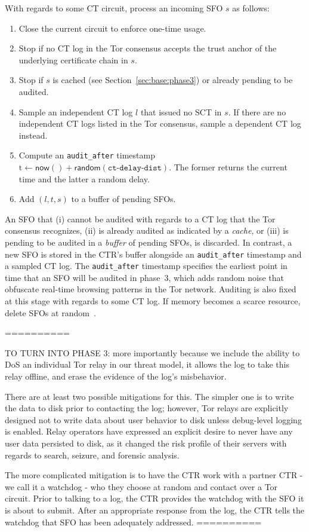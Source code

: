With regards to some CT circuit, process an incoming SFO $s$ as follows:
\begin{enumerate}
    \item\label{enm:storage:close} Close the current circuit to enforce one-time
        usage.
    \item\label{enm:storage:unrecognized} Stop if no CT log in the Tor consensus
        accepts the trust anchor of the underlying certificate chain in $s$.
    \item\label{enm:storage:cached}
        Stop if $s$ is cached (see Section~\ref{sec:base:phase3}) or already pending to be audited.
    \item\label{enm:storage:fix-log} Sample an independent CT log $l$ that
        issued no SCT in $s$.  If there are no independent CT logs listed in the
        Tor consensus, sample a dependent CT log instead.
    \item\label{enm:storage:audit-after} Compute an \texttt{audit\_after}
        timestamp $\textrm{t} \gets \mathsf{now()} +
            \mathsf{random}(\texttt{ct-delay-dist})$.
        The former returns the current time and the latter a random delay.
    \item\label{enm:storage:store} Add $(l,t,s)$ to a buffer of pending SFOs.
\end{enumerate}

An SFO that
    (i) cannot be audited with regards to a CT log that the Tor consensus
        recognizes,
    (ii) is already audited as indicated by a \emph{cache}, or
    (iii) is pending to be audited in a \emph{buffer} of pending SFOs,
is discarded.  In contrast, a new SFO is stored in the CTR's buffer
alongside an \texttt{audit\_after} timestamp and a sampled CT log.  The
\texttt{audit\_after} timestamp specifies the earliest point in time that an SFO
will be audited in phase~3, which adds random noise that obfuscate real-time
browsing patterns in the Tor network.  Auditing is also fixed at this stage with
regards to some CT log.  If memory becomes a scarce resource, delete SFOs at
random~\cite{nordberg}.

==========


TO TURN INTO PHASE 3:
more importantly because we include the ability to DoS an individual Tor relay in our
threat model, it allows the log to take this relay offline, and erase the evidence
of the log's misbehavior.

There are at least two possible mitigations for this. The simpler one is to write
the data to disk prior to contacting the log; however, Tor relays are explicitly
designed not to write data about user behavior to disk unless debug-level logging
is enabled. Relay operators have expressed an explicit desire to never have any 
user data persisted to disk, as it changed the risk profile of their servers with
regards to search, seizure, and forensic analysis.

The more complicated mitigation is to have the CTR work with a partner CTR - we call it
a watchdog - who they choose at random and contact over a Tor circuit. Prior to talking
to a log, the CTR provides the watchdog with the SFO it is about to submit. After
an appropriate response from the log, the CTR tells the watchdog that SFO has been
adequately addressed.  
==========